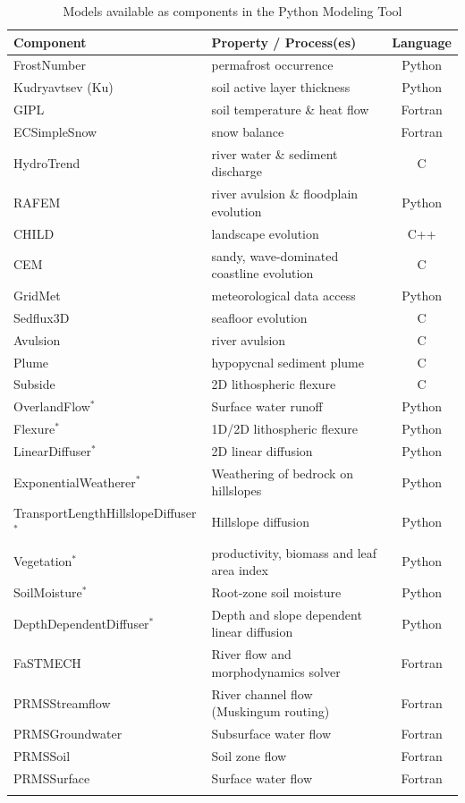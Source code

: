 \documentclass[journal abbreviation, manuscript]{copernicus}
\begin{document}
\begin{table}[htbp]
    \caption{Models available as components in the Python Modeling Tool}
    \begin{tabular}{llc}
        \hline
        \textbf{Component} & \textbf{Property / Process(es)} & \textbf{Language} \\
        \hline
        FrostNumber & permafrost occurrence & Python \\
        Kudryavtsev (Ku) & soil active layer thickness & Python \\
        GIPL & soil temperature \& heat flow & Fortran \\
        ECSimpleSnow & snow balance & Fortran \\
        HydroTrend & river water \& sediment discharge & C \\
        RAFEM & river avulsion \& floodplain evolution & Python \\
        CHILD & landscape evolution & C++ \\
        CEM & sandy, wave-dominated coastline evolution & C \\
        GridMet & meteorological data access & Python \\
        Sedflux3D &  seafloor evolution & C \\
        Avulsion & river avulsion & C \\
        Plume & hypopycnal sediment plume& C \\
        Subside & 2D lithospheric flexure & C \\
        OverlandFlow$^*$ & Surface water runoff & Python \\
        Flexure$^*$ & 1D/2D lithospheric flexure & Python \\
        LinearDiffuser$^*$ & 2D linear diffusion & Python \\
        ExponentialWeatherer$^*$ & Weathering of bedrock on hillslopes & Python \\
        TransportLengthHillslopeDiffuser$^*$ & Hillslope diffusion & Python \\
        Vegetation$^*$ & productivity, biomass and leaf area index & Python \\
        SoilMoisture$^*$ & Root-zone soil moisture & Python \\
        DepthDependentDiffuser$^*$ & Depth and slope dependent linear diffusion & Python \\
        FaSTMECH & River flow and morphodynamics solver & Fortran \\
        PRMSStreamflow & River channel flow (Muskingum routing) & Fortran \\
        PRMSGroundwater & Subsurface water flow & Fortran \\
        PRMSSoil & Soil zone flow & Fortran \\
        PRMSSurface & Surface water flow & Fortran \\
        \hline
        \hskip1em (* = Landlab component) & \\
   \end{tabular}
   \label{tab:components}
\end{table}
\end{document}
